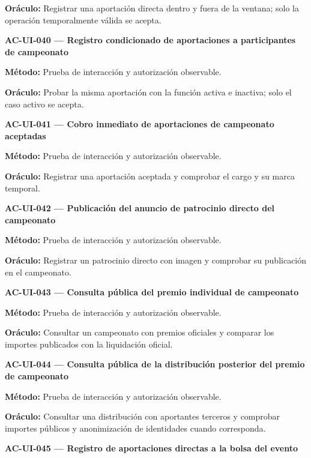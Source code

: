 \documentclass[10pt,letterpaper]{article}
\begin{document}
\textbf{Oráculo:} Registrar una aportación directa dentro y fuera de la ventana; solo la operación temporalmente válida se acepta.\par\vspace{0.45em}
\noindent\textbf{AC-UI-040 --- Registro condicionado de aportaciones a participantes de campeonato}\par
\textbf{Método:} Prueba de interacción y autorización observable.\par
\textbf{Oráculo:} Probar la misma aportación con la función activa e inactiva; solo el caso activo se acepta.\par\vspace{0.45em}
\noindent\textbf{AC-UI-041 --- Cobro inmediato de aportaciones de campeonato aceptadas}\par
\textbf{Método:} Prueba de interacción y autorización observable.\par
\textbf{Oráculo:} Registrar una aportación aceptada y comprobar el cargo y su marca temporal.\par\vspace{0.45em}
\noindent\textbf{AC-UI-042 --- Publicación del anuncio de patrocinio directo del campeonato}\par
\textbf{Método:} Prueba de interacción y autorización observable.\par
\textbf{Oráculo:} Registrar un patrocinio directo con imagen y comprobar su publicación en el campeonato.\par\vspace{0.45em}
\noindent\textbf{AC-UI-043 --- Consulta pública del premio individual de campeonato}\par
\textbf{Método:} Prueba de interacción y autorización observable.\par
\textbf{Oráculo:} Consultar un campeonato con premios oficiales y comparar los importes publicados con la liquidación oficial.\par\vspace{0.45em}
\noindent\textbf{AC-UI-044 --- Consulta pública de la distribución posterior del premio de campeonato}\par
\textbf{Método:} Prueba de interacción y autorización observable.\par
\textbf{Oráculo:} Consultar una distribución con aportantes terceros y comprobar importes públicos y anonimización de identidades cuando corresponda.\par\vspace{0.45em}
\noindent\textbf{AC-UI-045 --- Registro de aportaciones directas a la bolsa del evento}\par
\end{document}
